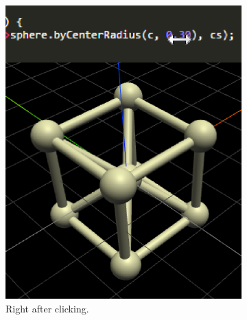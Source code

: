 \begin{figure}
  \centering
  \begin{subfigure}[b]{0.32\linewidth}
    \includegraphics[width=1.0\linewidth]{./images/literal_adjustment/start_crop}
    \caption{Right after clicking.}
  \end{subfigure}
  \begin{subfigure}[b]{0.32\linewidth}

\end{subfigure}
\end{figure}
